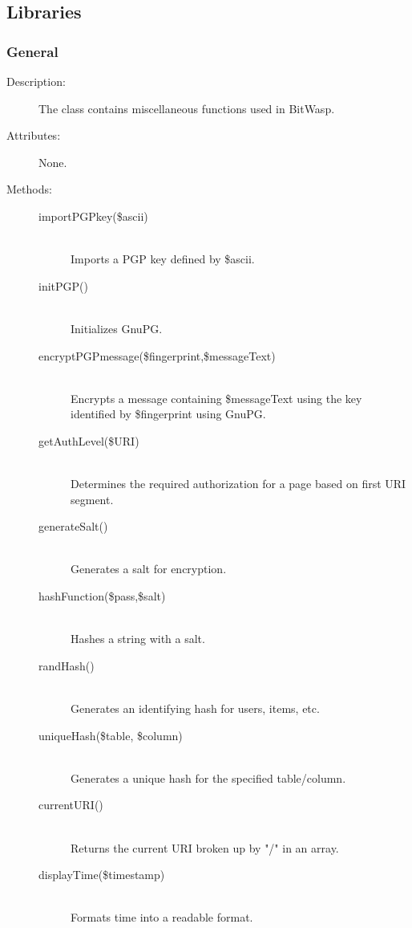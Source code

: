 \documentclass[11pt]{article} %
\begin{document}
\subsection{Libraries}
\subsubsection{General}
\begin{description}
\item[Description:] The class contains miscellaneous functions used in BitWasp.
\item[Attributes:] None.
\item[Methods:] \textbf{ }
\begin{description}
\item[importPGPkey(\$ascii)]  \textbf{ }\\
Imports a PGP key defined by \$ascii.
\item[initPGP()]  \textbf{ }\\
Initializes GnuPG.
\item[encryptPGPmessage(\$fingerprint,\$messageText)]  \textbf{ }\\
Encrypts a message containing \$messageText using the key identified by \$fingerprint using GnuPG.
\item[getAuthLevel(\$URI)]  \textbf{ }\\
Determines the required authorization for a page based on first URI segment.
\item[generateSalt()]  \textbf{ }\\
Generates a salt for encryption.
\item[hashFunction(\$pass,\$salt)]  \textbf{ }\\
Hashes a string with a salt.
\item[randHash()]  \textbf{ }\\
Generates an identifying hash for users, items, etc.
\item[uniqueHash(\$table, \$column)]  \textbf{ }\\
Generates a unique hash for the specified table/column.
\item[currentURI()]  \textbf{ }\\
Returns the current URI broken up by "/" in an array.
\item[displayTime(\$timestamp)]  \textbf{ }\\
Formats time into a readable format.
\end{description} 
\end{description} 
\end{document}
